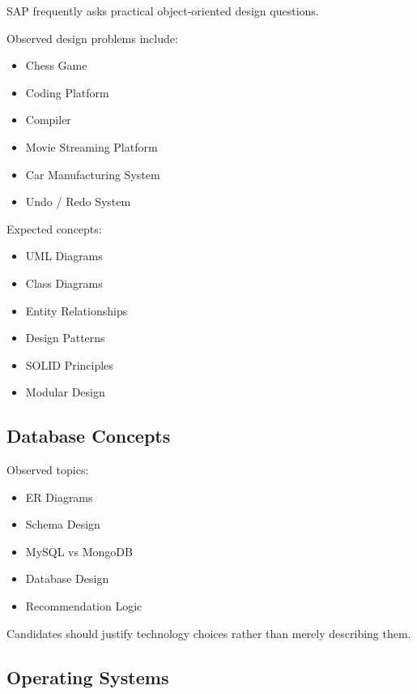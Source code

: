 \documentclass[11pt,a4paper]{article}
\begin{document}
SAP frequently asks practical object-oriented design questions.

Observed design problems include:

\begin{itemize}
	\item Chess Game
	\item Coding Platform
	\item Compiler
	\item Movie Streaming Platform
	\item Car Manufacturing System
	\item Undo / Redo System
\end{itemize}

Expected concepts:

\begin{itemize}
	\item UML Diagrams
	\item Class Diagrams
	\item Entity Relationships
	\item Design Patterns
	\item SOLID Principles
	\item Modular Design
\end{itemize}


\subsection{Database Concepts}

Observed topics:

\begin{itemize}
	\item ER Diagrams
	\item Schema Design
	\item MySQL vs MongoDB
	\item Database Design
	\item Recommendation Logic
\end{itemize}

Candidates should justify technology choices rather than merely describing them.


\subsection{Operating Systems}
\end{document}
